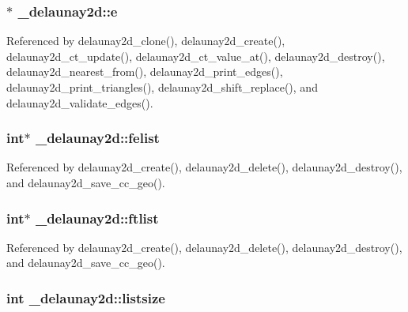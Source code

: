 \subsubsection[{\texorpdfstring{e}{e}}]{$\ast$ \+\_\+delaunay2d\+::e}\hypertarget{struct__delaunay2d_ad7e8751212a91171cb56564db1b18db7}{}\label{struct__delaunay2d_ad7e8751212a91171cb56564db1b18db7}


Referenced by delaunay2d\+\_\+clone(), delaunay2d\+\_\+create(), delaunay2d\+\_\+ct\+\_\+update(), delaunay2d\+\_\+ct\+\_\+value\+\_\+at(), delaunay2d\+\_\+destroy(), delaunay2d\+\_\+nearest\+\_\+from(), delaunay2d\+\_\+print\+\_\+edges(), delaunay2d\+\_\+print\+\_\+triangles(), delaunay2d\+\_\+shift\+\_\+replace(), and delaunay2d\+\_\+validate\+\_\+edges().

\subsubsection[{\texorpdfstring{felist}{felist}}]{\setlength{\rightskip}{0pt plus 5cm}int$\ast$ \+\_\+delaunay2d\+::felist}\hypertarget{struct__delaunay2d_aa35af1842ca721041a784d0c8e8be3af}{}\label{struct__delaunay2d_aa35af1842ca721041a784d0c8e8be3af}


Referenced by delaunay2d\+\_\+create(), delaunay2d\+\_\+delete(), delaunay2d\+\_\+destroy(), and delaunay2d\+\_\+save\+\_\+cc\+\_\+geo().

\subsubsection[{\texorpdfstring{ftlist}{ftlist}}]{\setlength{\rightskip}{0pt plus 5cm}int$\ast$ \+\_\+delaunay2d\+::ftlist}\hypertarget{struct__delaunay2d_aab5c78dc17e4974199fb84d94cebb76a}{}\label{struct__delaunay2d_aab5c78dc17e4974199fb84d94cebb76a}


Referenced by delaunay2d\+\_\+create(), delaunay2d\+\_\+delete(), delaunay2d\+\_\+destroy(), and delaunay2d\+\_\+save\+\_\+cc\+\_\+geo().

\subsubsection[{\texorpdfstring{listsize}{listsize}}]{\setlength{\rightskip}{0pt plus 5cm}int \+\_\+delaunay2d\+::listsize}\hypertarget{struct__delaunay2d_aba24fa0c4a9841f5aafe0b883b7f63db}{}\label{struct__delaunay2d_aba24fa0c4a9841f5aafe0b883b7f63db}


